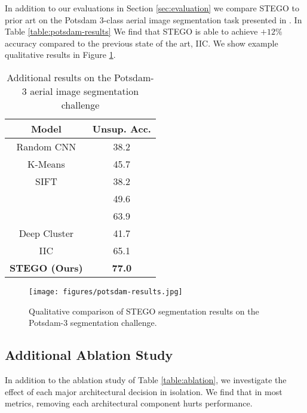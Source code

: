 \documentclass{article} \usepackage{iclr2022_conference,times}
\begin{document}
In addition to our evaluations in Section \ref{sec:evaluation} we compare STEGO to prior art on the Potsdam 3-class aerial image segmentation task presented in \cite{iic}. In Table \ref{table:potsdam-results} We find that STEGO is able to achieve $+12\%$ accuracy compared to the previous state of the art, IIC. We show example qualitative results in Figure \ref{fig:potsdam-results}.

\begin{table}[h]
\centering
\caption{Additional results on the Potsdam-3 aerial image segmentation challenge}
\begin{tabular}{c|c}
\textbf{Model}        & \textbf{Unsup. Acc.} \\ \hline
Random CNN  \citep{iic}          & 38.2                 \\
K-Means  \citep{pedregosa2011scikit}             & 45.7                 \\
SIFT    \citep{SIFT}              & 38.2                 \\
\cite{doersh15}              & 49.6                 \\
\cite{isola16}                 & 63.9                 \\
Deep Cluster  \citep{deep-cluster}         & 41.7                 \\
IIC \citep{iic}                   & 65.1                 \\
\textbf{STEGO (Ours)} & \textbf{77.0}       
\end{tabular}
\label{tab:potsdam-results}
\end{table}


 \begin{figure}[h]
 \centering
 \texttt{[image: figures/potsdam-results.jpg]}
  \caption{Qualitative comparison of STEGO segmentation results on the Potsdam-3 segmentation challenge.}
\label{fig:potsdam-results}
\end{figure}

\newpage

\subsection{Additional Ablation Study}

In addition to the ablation study of Table \ref{table:ablation}, we investigate the effect of each major architectural decision in isolation. We find that in most metrics, removing each architectural component hurts performance.
\end{document}

